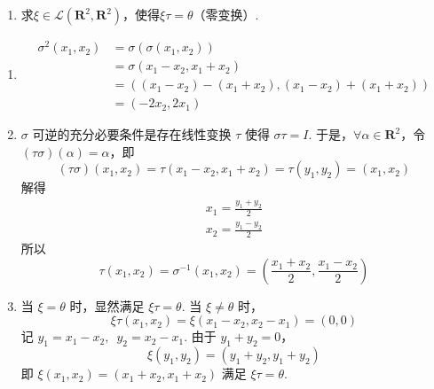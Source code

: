 \begin{exercise}
\begin{exgroup}
\begin{enumerate}
            \item 求$\xi\in \mathcal{L}(\mathbf{R}^2,\mathbf{R}^2)$，使得$\xi\tau=\theta$（零变换）.
        \end{enumerate}

        \begin{answer}
            \begin{enumerate}
                \item \begin{align*}
                          \sigma^2(x_1, x_2) & = \sigma(\sigma(x_1, x_2))                               \\
                                             & = \sigma(x_1 - x_2, x_1 + x_2)                           \\
                                             & = ((x_1 - x_2) - (x_1 + x_2), (x_1 - x_2) + (x_1 + x_2)) \\
                                             & = (-2 x_2, 2 x_1)
                      \end{align*}

                \item $ \sigma $ 可逆的充分必要条件是存在线性变换 $ \tau $ 使得 $ \sigma \tau = I $. 于是，$ \forall \alpha \in \mathbf{R}^2 $，令 $ (\tau \sigma)(\alpha) = \alpha $，即
                      \[ (\tau \sigma)(x_1, x_2) = \tau(x_1 - x_2, x_1 + x_2) = \tau(y_1, y_2) = (x_1, x_2) \]
                      解得
                      \begin{gather*}
                          x_1 = \frac{y_1 + y_2}{2} \\
                          x_2 = \frac{y_1 - y_2}{2}
                      \end{gather*}
                      所以
                      \[ \tau(x_1, x_2) = \sigma^{-1}(x_1, x_2) = \left(\frac{x_1 + x_2}{2}, \frac{x_1 - x_2}{2}\right) \]

                \item 当 $ \xi = \theta $ 时，显然满足 $ \xi \tau = \theta $. 当 $ \xi \neq \theta $ 时，
                      \[ \xi \tau(x_1, x_2) = \xi(x_1 - x_2, x_2 - x_1) = (0, 0) \]
                      记 $ y_1 = x_1 - x_2,\enspace y_2 = x_2 - x_1 $. 由于 $ y_1 + y_2 = 0 $，
                      \[ \xi(y_1, y_2) = (y_1 + y_2, y_1 + y_2) \]
                      即 $ \xi(x_1, x_2) = (x_1 + x_2, x_1 + x_2) $ 满足 $ \xi \tau = \theta $.
            \end{enumerate}

        \end{answer}


\end{exgroup}
\end{exercise}
